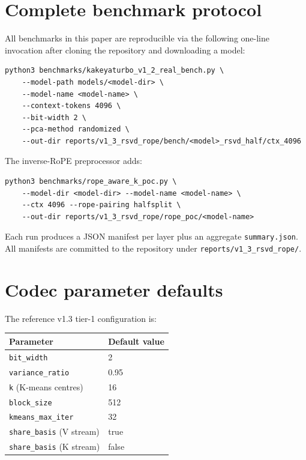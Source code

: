 \documentclass[11pt,a4paper]{article}
\theoremstyle{definition}
\theoremstyle{plain}
\begin{document}
\appendix

\section{Complete benchmark protocol}
\label{app:protocol}

All benchmarks in this paper are reproducible via the following one-line invocation after cloning the repository and downloading a model:
\begin{verbatim}
python3 benchmarks/kakeyaturbo_v1_2_real_bench.py \
    --model-path models/<model-dir> \
    --model-name <model-name> \
    --context-tokens 4096 \
    --bit-width 2 \
    --pca-method randomized \
    --out-dir reports/v1_3_rsvd_rope/bench/<model>_rsvd_half/ctx_4096
\end{verbatim}
The inverse-RoPE preprocessor adds:
\begin{verbatim}
python3 benchmarks/rope_aware_k_poc.py \
    --model-dir <model-dir> --model-name <model-name> \
    --ctx 4096 --rope-pairing halfsplit \
    --out-dir reports/v1_3_rsvd_rope/rope_poc/<model-name>
\end{verbatim}

Each run produces a JSON manifest per layer plus an aggregate \verb|summary.json|. All manifests are committed to the repository under \verb|reports/v1_3_rsvd_rope/|.

\section{Codec parameter defaults}
\label{app:params}

The reference v1.3 tier-1 configuration is:
\begin{center}
\begin{tabular}{ll}
  \toprule
  Parameter & Default value \\
  \midrule
  \texttt{bit\_width} & 2 \\
  \texttt{variance\_ratio} & 0.95 \\
  \texttt{k} (K-means centres) & 16 \\
  \texttt{block\_size} & 512 \\
  \texttt{kmeans\_max\_iter} & 32 \\
  \texttt{share\_basis} (V stream) & true \\
  \texttt{share\_basis} (K stream) & false \\
  \bottomrule
\end{tabular}
\end{center}
\end{document}
